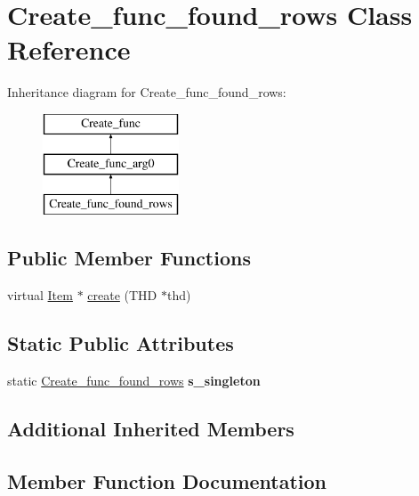 \hypertarget{classCreate__func__found__rows}{}\section{Create\+\_\+func\+\_\+found\+\_\+rows Class Reference}
\label{classCreate__func__found__rows}
Inheritance diagram for Create\+\_\+func\+\_\+found\+\_\+rows\+:\begin{figure}[H]
\begin{center}
\leavevmode
\includegraphics[height=3.000000cm]{classCreate__func__found__rows}
\end{center}
\end{figure}
\subsection*{Public Member Functions}
\begin{DoxyCompactItemize}
\item 
virtual \mbox{\hyperlink{classItem}{Item}} $\ast$ \mbox{\hyperlink{classCreate__func__found__rows_a823602b19114167351b766c354db3f2a}{create}} (T\+HD $\ast$thd)
\end{DoxyCompactItemize}
\subsection*{Static Public Attributes}
\begin{DoxyCompactItemize}
\item 
\mbox{\label{classCreate__func__found__rows_ab2b3e4d2d6a7432090d5406e9981984a}} 
static \mbox{\hyperlink{classCreate__func__found__rows}{Create\+\_\+func\+\_\+found\+\_\+rows}} {\bfseries s\+\_\+singleton}
\end{DoxyCompactItemize}
\subsection*{Additional Inherited Members}


\subsection{Member Function Documentation}
\mbox{\label{classCreate__func__found__rows_a823602b19114167351b766c354db3f2a}} 
